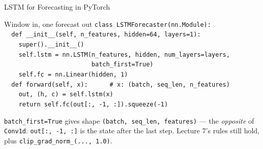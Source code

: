 \documentclass[aspectratio=169, 11pt]{beamer}
\begin{document}
\begin{frame}{LSTM for Forecasting in PyTorch}
  \begin{examplebox}{Window in, one forecast out}
    {\tiny\linespread{1.2}\selectfont
    \texttt{class LSTMForecaster(nn.Module):}\\
    \texttt{\ \ def \_\_init\_\_(self, n\_features, hidden=64, layers=1):}\\
    \texttt{\ \ \ \ super().\_\_init\_\_()}\\
    \texttt{\ \ \ \ self.lstm = nn.LSTM(n\_features, hidden, num\_layers=layers,}\\
    \texttt{\ \ \ \ \ \ \ \ \ \ \ \ \ \ \ \ \ \ \ \ \ \ \ \ batch\_first=True)}\\
    \texttt{\ \ \ \ self.fc = nn.Linear(hidden, 1)}\\[3pt]
    \texttt{\ \ def forward(self, x):\ \ \ \ \ \ \# x: (batch, seq\_len, n\_features)}\\
    \texttt{\ \ \ \ out, (h, c) = self.lstm(x)}\\
    \texttt{\ \ \ \ return self.fc(out[:, -1, :]).squeeze(-1)}
    }
  \end{examplebox}
  \texttt{batch\_first=True} gives shape \texttt{(batch, seq\_len, features)} --- the
  \emph{opposite} of \texttt{Conv1d}. \texttt{out[:, -1, :]} is the state after the last step.
  Lecture 7's rules still hold, plus \texttt{clip\_grad\_norm\_(..., 1.0)}.
\end{frame}
\end{document}

